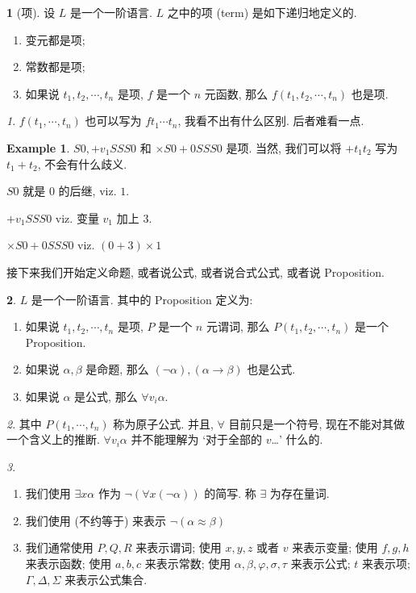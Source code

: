 \documentclass[a4paper, 12pt]{ctexbook} %
\theoremstyle{plain}
\theoremstyle{definition}
\newtheorem{example}{\llap{$\bigstar$}\space Example}
\newtheorem{definition}{\llap{Definition}\space}[section]
\theoremstyle{remark}
\newtheorem{remark}{\llap{Remark}\space}
\begin{document}
\begin{definition}[项]
设 $L$ 是一个一阶语言. $L$ 之中的项 (term) 是如下递归地定义的. 
\begin{enumerate}
    \item 变元都是项; 
    \item 常数都是项;
    \item 如果说 $t_1 , t_2 ,\cdots , t_{n}$ 是项, $f$ 是一个 $n$ 元函数, 那么 $f \left( t_{1} , t_{2} , \cdots  , t_{n}\right)$ 也是项. 
\end{enumerate}
\end{definition}
\begin{remark}
$f\left(t_{1},  \cdots  , t_{n} \right)$ 也可以写为 $f t _{1} \cdots t_{n}$, 我看不出有什么区别. 后者难看一点. 
\end{remark}
\begin{example}
$S 0, + v_{1} SSS 0 $ 和 $\times S 0 + 0 S SS 0 $ 是项. 当然, 我们可以将 $ + t_{1} t_{2} $ 写为 
$t _{1}  + t_{2} $, 不会有什么歧义. 

$S 0 $ 就是 $0$ 的后继, viz. $1$. 

$+ v_{1} SSS 0 $ viz. 变量 $v_{1}$ 加上 $3$.

$\times S 0 + 0 SSS 0 $ viz. $\left( 0 + 3\right) \times 1$
\end{example}
接下来我们开始定义命题, 或者说公式, 或者说合式公式, 或者说 Proposition.
\begin{definition}
$L$ 是一个一阶语言. 其中的 Proposition 定义为: 
\begin{enumerate}
    \item 如果说 $t_{1} , t_{2} , \cdots  , t_{n}$ 是项, $P$ 是一个 $n$ 元谓词, 
    那么 $P \left( t_{1} , t_{2} , \cdots, t_{n} \right)$ 是一个 Proposition.
    \item 如果说 $\alpha , \beta$ 是命题, 那么 $ \left( \neg \alpha \right) , \left( \alpha \to \beta \right)$ 也是公式. 
    \item 如果说 $\alpha $ 是公式, 那么 $ \forall  v_{i} \alpha$. 
\end{enumerate}
\end{definition}
\begin{remark}
其中 $P\left( t_{1} , \cdots  , t_{n}\right)$ 称为原子公式. 
并且, $\forall $ 目前只是一个符号, 现在不能对其做一个含义上的推断. 
$\forall v_{i} \alpha$ 并不能理解为 `对于全部的 $v$\dots' 什么的. 
\end{remark}
\begin{remark}
\begin{enumerate}
    \item 我们使用 $\exists x \alpha $ 作为 $\neg \left( \forall  x \left( \neg \alpha\right)\right)$ 的简写. 称 $\exists$ 为存在量词. 
    \item 我们使用 (不约等于) 来表示 $\neg \left( \alpha \approx \beta\right)$
    \item 我们通常使用 $P, Q,  R$ 来表示谓词; 使用 $x,  y , z $ 或者 $v$ 来表示变量; 使用 $f , g , h$ 来表示函数; 
    使用 $a ,  b  , c$ 来表示常数; 使用 $\alpha , \beta , \varphi, \sigma , \tau$ 来表示公式; $t$ 来表示项; $\Gamma , \Delta , \Sigma$ 来表示公式集合. 
\end{enumerate}
\end{remark}
\end{document}
